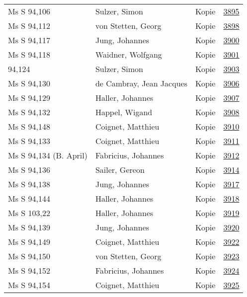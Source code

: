 \documentclass[10pt,a4paper,landscape]{report}
\begin{document}
\begin{longtable}{p{16cm}p{4cm}lr}
Ms S 94,106	&	Sulzer, Simon	&	Kopie	&	\href{http://130.60.24.72/assignment/3895}{3895}\\
Ms S 94,112	&	von Stetten, Georg	&	Kopie	&	\href{http://130.60.24.72/assignment/3898}{3898}\\
Ms S 94,117	&	Jung, Johannes	&	Kopie	&	\href{http://130.60.24.72/assignment/3900}{3900}\\
Ms S 94,118	&	Waidner, Wolfgang	&	Kopie	&	\href{http://130.60.24.72/assignment/3901}{3901}\\
94,124	&	Sulzer, Simon	&	Kopie	&	\href{http://130.60.24.72/assignment/3903}{3903}\\
Ms S 94,130	&	de Cambray, Jean Jacques	&	Kopie	&	\href{http://130.60.24.72/assignment/3906}{3906}\\
Ms S 94,129	&	Haller, Johannes	&	Kopie	&	\href{http://130.60.24.72/assignment/3907}{3907}\\
Ms S 94,132	&	Happel, Wigand	&	Kopie	&	\href{http://130.60.24.72/assignment/3908}{3908}\\
Ms S 94,148	&	Coignet, Matthieu	&	Kopie	&	\href{http://130.60.24.72/assignment/3910}{3910}\\
Ms S 94,133	&	Coignet, Matthieu	&	Kopie	&	\href{http://130.60.24.72/assignment/3911}{3911}\\
Ms S 94,134 (B. April)	&	Fabricius, Johannes	&	Kopie	&	\href{http://130.60.24.72/assignment/3912}{3912}\\
Ms S 94,136	&	Sailer, Gereon	&	Kopie	&	\href{http://130.60.24.72/assignment/3914}{3914}\\
Ms S 94,138	&	Jung, Johannes	&	Kopie	&	\href{http://130.60.24.72/assignment/3917}{3917}\\
Ms S 94,144	&	Haller, Johannes	&	Kopie	&	\href{http://130.60.24.72/assignment/3918}{3918}\\
Ms S 103,22	&	Haller, Johannes	&	Kopie	&	\href{http://130.60.24.72/assignment/3919}{3919}\\
Ms S 94,139	&	Jung, Johannes	&	Kopie	&	\href{http://130.60.24.72/assignment/3920}{3920}\\
Ms S 94,149	&	Coignet, Matthieu	&	Kopie	&	\href{http://130.60.24.72/assignment/3922}{3922}\\
Ms S 94,150	&	von Stetten, Georg	&	Kopie	&	\href{http://130.60.24.72/assignment/3923}{3923}\\
Ms S 94,152	&	Fabricius, Johannes	&	Kopie	&	\href{http://130.60.24.72/assignment/3924}{3924}\\
Ms S 94,154	&	Coignet, Matthieu	&	Kopie	&	\href{http://130.60.24.72/assignment/3925}{3925}\\

\end{longtable}
\end{document}
